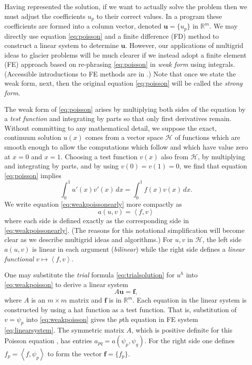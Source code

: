\documentclass[letterpaper,final,12pt,reqno]{amsart}
\newcommand{\RR}{\mathbb{R}}
\newcommand{\bbf}{\mathbf{f}}
\newcommand{\bu}{\mathbf{u}}
\newcommand{\ip}[2]{\left<#1,#2\right>}
\begin{document}
Having represented the solution, if we want to actually solve the problem then we must adjust the coefficients $u_p$ to their correct values.  In a program these coefficients are formed into a column vector, denoted $\bu=\{u_p\}$ in $\RR^m$.  We may directly use equation \eqref{eq:poisson} and a finite difference (FD) method \cite{LeVeque2007} to construct a linear system to determine $\bu$.  However, our applications of multigrid ideas to glacier problems will be much clearer if we instead adopt a finite element (FE) approach based on re-phrasing \eqref{eq:poisson} in \emph{weak form} using integrals.  (Accessible introductions to FE methods are in \cite{Bueler2021,Elmanetal2014,Johnson2009}.)  Note that once we state the weak form, next, then the original equation \eqref{eq:poisson} will be called the \emph{strong form}.

The weak form of \eqref{eq:poisson} arises by multiplying both sides of the equation by a \emph{test function} and integrating by parts so that only first derivatives remain.  Without committing to any mathematical detail, we suppose the exact, continuum solution $u(x)$ comes from a vector space $\mathcal{H}$ of functions which are smooth enough to allow the computations which follow and which have value zero at $x=0$ and $x=1$.  Choosing a test function $v(x)$ also from $\mathcal{H}$, by multiplying and integrating by parts, and by using $v(0)=v(1)=0$, we find that equation \eqref{eq:poisson} implies
\begin{equation}
\int_0^1 u'(x) v'(x)\,dx = \int_0^1 f(x) v(x)\, dx.  \label{eq:weakpoissonearly}
\end{equation}
We write equation \eqref{eq:weakpoissonearly} more compactly as
\begin{equation}
  a(u,v) = \ip{f}{v} \label{eq:weakpoisson}
\end{equation}
where each side is defined exactly as the corresponding side in \eqref{eq:weakpoissonearly}.  (The reasons for this notational simplification will become clear as we describe multigrid ideas and algorithms.)  For $u,v$ in $\mathcal{H}$, the left side $a(u,v)$ is linear in each argument (\emph{bilinear}) while the right side defines a \emph{linear functional} $v\mapsto \ip{f}{v}$.

One may substitute the \emph{trial} formula \eqref{eq:trialsolution} for $u^h$ into \eqref{eq:weakpoisson} to derive a linear system
\begin{equation}
A \bu = \bbf, \label{eq:linearsystem}
\end{equation}
where $A$ is an $m\times m$ matrix and $\bbf$ is in $\RR^m$.  Each equation in the linear system is constructed by using a hat function as a test function.  That is, substitution of $v=\psi_p$ into \eqref{eq:weakpoisson} gives the $p$th equation in FE system \eqref{eq:linearsystem}.  The symmetric matrix $A$, which is positive definite for this Poisson equation \cite{Elmanetal2014}, has entries $a_{pq} = a(\psi_p,\psi_q)$.  For the right side one defines $f_p = \ip{f}{\psi_p}$ to form the vector $\bbf = \{f_p\}$.
\end{document}
